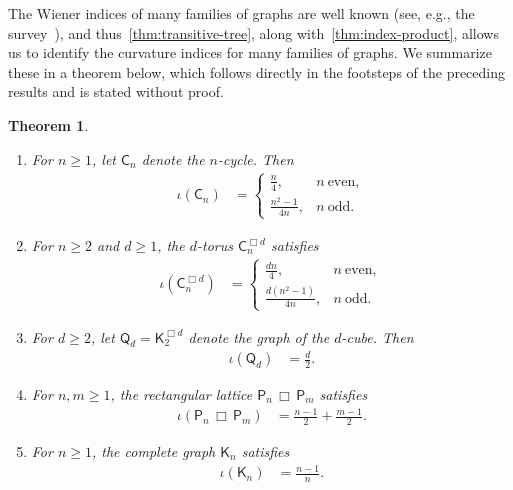 \documentclass[11pt,a4paper]{article}
\newcommand{\Path}{\mathsf{P}}
\newcommand{\Cube}{\mathsf{Q}}
\newcommand{\Cycle}{\mathsf{C}}
\newcommand{\Complete}{\mathsf{K}}
\newtheorem{theorem}{Theorem}[section]
\begin{document}
    The Wiener indices of many families of graphs are well known (see, e.g., the survey~\cite{knor2019some}), and thus~\cref{thm:transitive-tree}, along with~\cref{thm:index-product}, allows us to identify the curvature indices for many families of graphs. We summarize these in a theorem below, which follows directly in the footsteps of the preceding results and is stated without proof.

    \begin{theorem}\label{thm:examples}
        \begin{enumerate}[label=(\roman*)]
            \item For $n\ge1$, let $\Cycle_n$ denote the $n$-cycle. Then
                \begin{align*}
                    \iota(\Cycle_n) &= \begin{cases}
                        \frac{n}{4}, & n\ \text{even},\\
                        \frac{n^2-1}{4n}, & n\ \text{odd}.
                    \end{cases}
                \end{align*}
            \item For $n\ge 2$ and $d\geq 1$, the $d$-torus $\Cycle_n^{\Box d}$ satisfies
                \begin{align*}
                    \iota(\Cycle_n^{\Box d}) &= \begin{cases}
                        \frac{dn}{4}, & n\ \text{even},\\
                        \frac{d(n^2-1)}{4n}, & n\ \text{odd}.
                    \end{cases}
                \end{align*}
            \item For $d\ge 2$, let $\Cube_d = \Complete_2^{\Box d}$ denote the graph of the $d$-cube. Then
                \begin{align*}
                    \iota(\Cube_d) &= \frac{d}{2}.
                \end{align*}    
            \item For $n, m\geq 1$, the rectangular lattice $\Path_n \,\Box\, \Path_m$ satisfies
                \begin{align*}
                    \iota(\Path_n\,\Box\, \Path_m) &= \frac{n-1}{2} + \frac{m-1}{2}.
                \end{align*}
            \item For $n\geq 1$, the complete graph $\Complete_n$ satisfies
                \begin{align*}
                    \iota(\Complete_n) &= \frac{n-1}{n}.
                \end{align*}
        \end{enumerate}
    \end{theorem}
\end{document}
